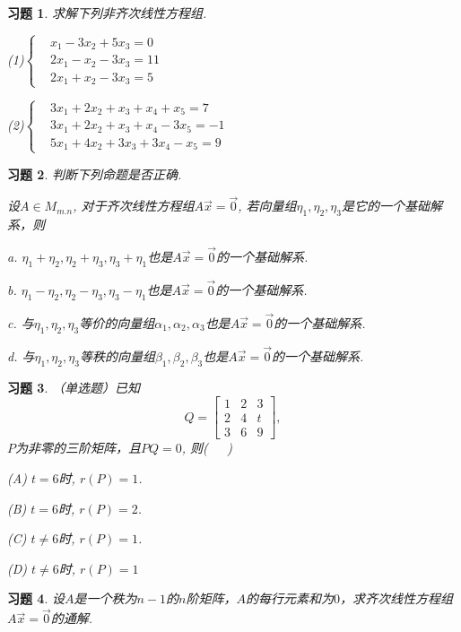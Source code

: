 \documentclass[a4paper]{book}
\newtheorem{ex}{习题}[chapter]
\begin{document}
\begin{ex}\label{5.12}
求解下列非齐次线性方程组.

(1)$\left\{\begin{aligned}&x_1-3x_2+5x_3=0 \\&2x_1-x_2-3x_3=11 \\&2x_1+x_2-3x_3=5     \end{aligned}\right.$

(2)$\left\{\begin{aligned}& 3x_1+2x_2+x_3+x_4+x_5=7 \\&3x_1+2x_2+x_3+x_4-3x_5=-1 \\&5x_1+4x_2+3x_3+3x_4-x_5=9    \end{aligned}\right.$
\end{ex}

\begin{ex}\label{5.13}
 判断下列命题是否正确.

设$A\in M_{m.n}$, 对于齐次线性方程组$A\vec{x}=\vec{0}$, 若向量组$\eta_1,\eta_2,\eta_3$是它的一个基础解系，则

a. $\eta_1+\eta_2, \eta_2+\eta_3, \eta_3+\eta_1$也是$A\vec{x}=\vec{0}$的一个基础解系.

b. $\eta_1-\eta_2, \eta_2-\eta_3, \eta_3-\eta_1$也是$A\vec{x}=\vec{0}$的一个基础解系.

c. 与$\eta_1,\eta_2,\eta_3$等价的向量组$\alpha_1,\alpha_2,\alpha_3$也是$A\vec{x}=\vec{0}$的一个基础解系.

d. 与$\eta_1,\eta_2,\eta_3$等秩的向量组$\beta_1,\beta_2,\beta_3$也是$A\vec{x}=\vec{0}$的一个基础解系.
\end{ex}

\begin{ex}\label{5.14}
（单选题）已知$$Q=\begin{bmatrix}1&2&3\\2&4&t\\3&6&9\end{bmatrix},$$ $P$为非零的三阶矩阵，且$PQ=0$, 则(\ \ \ )

(A) $t=6$时, $r(P)=1$.

(B) $t=6$时, $r(P)=2$.

(C) $t\not=6$时, $r(P)=1$.

(D) $t\not=6$时, $r(P)=1$
\end{ex}

\begin{ex}\label{5.15}
设$A$是一个秩为$n-1$的$n$阶矩阵，$A$的每行元素和为$0$，求齐次线性方程组$A\vec{x}=\vec{0}$的通解.
\end{ex}
\end{document}
